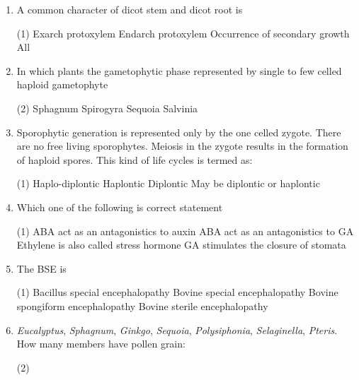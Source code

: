 \documentclass[twocolumn]{article}
\begin{document}
\begin{enumerate}
    \item A common character of dicot stem and dicot root is
    \begin{tasks}(1)
        \task Exarch protoxylem
        \task Endarch protoxylem
        \task Occurrence of secondary growth
        \task All
    \end{tasks}

    \item In which plants the gametophytic phase represented by single to few celled haploid gametophyte
    \begin{tasks}(2)
        \task Sphagnum
        \task Spirogyra
        \task Sequoia
        \task Salvinia
    \end{tasks}

    \item Sporophytic generation is represented only by the one celled zygote. There are no free living sporophytes. Meiosis in the zygote results in the formation of haploid spores. This kind of life cycles is termed as:
    \begin{tasks}(1)
        \task Haplo-diplontic
        \task Haplontic
        \task Diplontic
        \task May be diplontic or haplontic
    \end{tasks}

    \item Which one of the following is correct statement
    \begin{tasks}(1)
        \task ABA act as an antagonistics to auxin
        \task ABA act as an antagonistics to GA
        \task Ethylene is also called stress hormone
        \task GA stimulates the closure of stomata
    \end{tasks}

    \item The BSE is
    \begin{tasks}(1)
        \task Bacillus special encephalopathy
        \task Bovine special encephalopathy
        \task Bovine spongiform encephalopathy
        \task Bovine sterile encephalopathy
    \end{tasks}

    \item \textit{Eucalyptus}, \textit{Sphagnum}, \textit{Ginkgo}, \textit{Sequoia}, \textit{Polysiphonia}, \textit{Selaginella}, \textit{Pteris}.
    How many members have pollen grain:
    \begin{tasks}(2)
    \end{tasks}


\end{enumerate}
\end{document}
